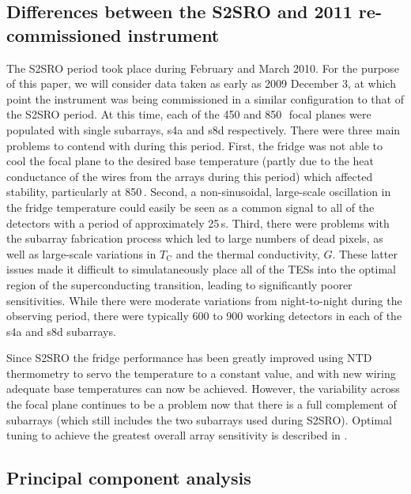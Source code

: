 \documentclass[useAMS,usenatbib,nofootinbib]{mn2e}
\begin{document}
\subsection{Differences between the S2SRO and 2011 re-commissioned instrument}
\label{sec:s2sro}

The S2SRO period took place during February and March 2010. For the
purpose of this paper, we will consider data taken as early as 2009
December 3, at which point the instrument was being commissioned in a
similar configuration to that of the S2SRO period. At this time, each
of the 450 and 850\,\micron\ focal planes were populated with single
subarrays, s4a and s8d respectively. There were three main problems to
contend with during this period. First, the fridge was not able to
cool the focal plane to the desired base temperature (partly due to
the heat conductance of the wires from the arrays during this period)
which affected stability, particularly at 850\,\micron. Second, a
non-sinusoidal, large-scale oscillation in the fridge temperature
could easily be seen as a common signal to all of the detectors with a
period of approximately 25\,s.  Third, there were problems with the
subarray fabrication process which led to large numbers of dead
pixels, as well as large-scale variations in $T_\mathrm{C}$ and the
thermal conductivity, $G$. These latter issues made it difficult to
simulataneously place all of the TESs into the optimal region of the
superconducting transition, leading to significantly poorer
sensitivities. While there were moderate variations from
night-to-night during the observing period, there were typically 600
to 900 working detectors in each of the s4a and s8d subarrays.

Since S2SRO the fridge performance has been greatly improved using NTD
thermometry to servo the temperature to a constant value, and with new
wiring adequate base temperatures can now be achieved. However, the
variability across the focal plane continues to be a problem now that
there is a full complement of subarrays (which still includes the two
subarrays used during S2SRO). Optimal tuning to achieve the greatest
overall array sensitivity is described in \citet{holland2012}.


\subsection{Principal component analysis}
\label{sec:pca}
\end{document}
